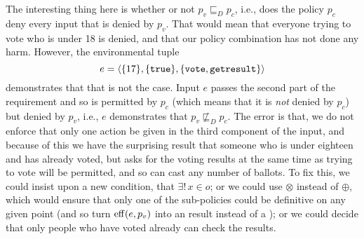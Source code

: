 The interesting thing here is whether or not $p_v \sqsubseteq_D p_c$,
i.e., does the policy $p_c$ deny every input that is denied by $p_v$.
That would mean that everyone trying to vote who is under 18 is
denied, and that our policy combination has not done any harm.
However, the environmental tuple \[e = \langle \{17\}, \{\text{\texttt{true}}\},
\{\text{\texttt{vote}}, \text{\texttt{getresult}} \} \rangle\] demonstrates that that is
not the case.  Input $e$ passes the second part of the \Permit{}
requirement and so is permitted by $p_c$ (which means that it is {\em
  not} denied by $p_c$) but denied by $p_v$, i.e., $e$ demonstrates
that $p_v \not \sqsubseteq_D p_c$.  The error is that, we do not
enforce that only one action be given in the third component of the
input, and because of this we have the surprising result that someone
who is under eighteen and has already voted, but asks for the voting
results at the same time as trying to vote will be permitted, and so
can cast any number of ballots.  To fix this, we could insist upon a
new condition, that $\exists ! \, x \in o$; or we could use $\otimes$
instead of $\oplus$, which would ensure that only one of the
sub-policies could be definitive on any given point (and so turn $\operatorname{eff}
(e, p_v)$ into an \Indeterminate{} result instead of a \Permit{}); or we
could decide that only people who have voted already can check the
results.


